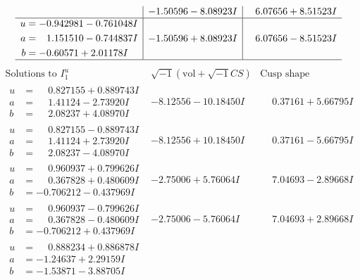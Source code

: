 \documentclass[1p]{elsarticle_modified}
\theoremstyle{definition}
\newcommand{\I}{\sqrt{-1}}
\begin{document}
$$\begin{array}{c|c|c}
 & -1.50596 - 8.08923 I & \phantom{-}6.07656 + 8.51523 I \\ \hline\begin{aligned}
u &= -0.942981 - 0.761048 I \\
a &= \phantom{-}1.151510 - 0.744837 I \\
b &= -0.60571 + 2.01178 I\end{aligned}
 & -1.50596 + 8.08923 I & \phantom{-}6.07656 - 8.51523 I\\
 \hline 
 \end{array}$$\newpage$$\begin{array}{c|c|c}  
\text{Solutions to }I^u_{1}& \I (\text{vol} + \sqrt{-1}CS) & \text{Cusp shape}\\
 \hline 
\begin{aligned}
u &= \phantom{-}0.827155 + 0.889743 I \\
a &= \phantom{-}1.41124 - 2.73920 I \\
b &= \phantom{-}2.08237 + 4.08970 I\end{aligned}
 & -8.12556 - 10.18450 I & \phantom{-}0.37161 + 5.66795 I \\ \hline\begin{aligned}
u &= \phantom{-}0.827155 - 0.889743 I \\
a &= \phantom{-}1.41124 + 2.73920 I \\
b &= \phantom{-}2.08237 - 4.08970 I\end{aligned}
 & -8.12556 + 10.18450 I & \phantom{-}0.37161 - 5.66795 I \\ \hline\begin{aligned}
u &= \phantom{-}0.960937 + 0.799626 I \\
a &= \phantom{-}0.367828 + 0.480609 I \\
b &= -0.706212 - 0.437969 I\end{aligned}
 & -2.75006 + 5.76064 I & \phantom{-}7.04693 - 2.89668 I \\ \hline\begin{aligned}
u &= \phantom{-}0.960937 - 0.799626 I \\
a &= \phantom{-}0.367828 - 0.480609 I \\
b &= -0.706212 + 0.437969 I\end{aligned}
 & -2.75006 - 5.76064 I & \phantom{-}7.04693 + 2.89668 I \\ \hline\begin{aligned}
u &= \phantom{-}0.888234 + 0.886878 I \\
a &= -1.24637 + 2.29159 I \\
b &= -1.53871 - 3.88705 I\end{aligned}

\end{array}$$
\end{document}
